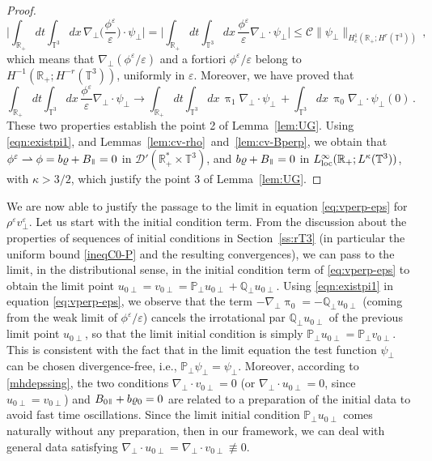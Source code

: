\documentclass[11pt,reqno]{amsart}
\def \R{{\mathbb{R}}}
\def \Q{{\mathbb{Q}}}
\def \T{{\mathbb{T}}}
\def \P{{\mathbb{P}}}
\newcommand{\myparallel}{{\mkern3mu\vphantom{\perp}\vrule depth 0pt\mkern2mu\vrule depth 0pt\mkern3mu}}
\begin{document}
\begin{proof}
\[
\bigg|\int_{\R_+}  dt \int_{\T^3}dx \, \nabla_\perp \Big(\frac{\phi^\varepsilon}{\varepsilon}\Big) \cdot \psi_\perp \bigg|
=\bigg|\int_{\R_+}  dt \int_{\T^3}dx \, \frac{\phi^\varepsilon}{\varepsilon} \nabla_\perp \cdot \psi_\perp \bigg|
\leq  \mathcal C \|\psi_\perp\|_{H_c^1(\R_+; H^r(\T^3))} \,,
\]
which means that $\nabla_\perp (\phi^\varepsilon/\varepsilon)$ and a fortiori $\phi^\varepsilon/\varepsilon$ belong to $H^{-1}(\R_+; H^{-r}(\T^3))$, uniformly in $\varepsilon$. Moreover, we have proved that
\[
\int_{\R_+}  dt \int_{\T^3}dx \, \frac{\phi^\varepsilon}{\varepsilon} \nabla_\perp \cdot \psi_\perp
\xrightarrow{\quad}  \int_{\R_+}  dt \int_{\T^3}dx \,  \uppi_1\nabla_\perp \cdot \psi_\perp\, +
\int_{\T^3}dx \,  \uppi_0\nabla_\perp \cdot \psi_\perp(0)\,.
\]
These two properties establish the point 2 of Lemma~\ref{lem:UG}. Using \eqref{eqn:existpi1}, and Lemmas~\ref{lem:cv-rho}~and~\ref{lem:cv-Bperp},  we obtain that $\phi^\varepsilon \rightharpoonup \phi=b \varrho + B_\myparallel =0$ in  $\mathcal D'(\R_+^* \times \T^3)$, and $b \varrho + B_\myparallel =0$ in $L_{\rm loc}^\infty(\R_+;L^\kappa(\T^3))$, with $\kappa >3/2$, which justify the point 3 of Lemma~\ref{lem:UG}.
\end{proof}  

We are now able to justify the passage to the limit in equation \eqref{eq:vperp-eps} for $\rho^\varepsilon v_\perp^\varepsilon$. Let us start with the initial condition term. From the discussion about the properties of sequences of initial conditions in Section~\ref{ss:rT3} (in particular the uniform bound \eqref{ineqC0-P} and the resulting convergences), we can pass to the limit, in the distributional sense, in the initial condition term of \eqref{eq:vperp-eps} to obtain the limit point  $u_{0 \perp } =v_{0 \perp }=\P_\perp u_{0 \perp } + \Q_\perp u_{0 \perp }$. Using \eqref{eqn:existpi1} in equation \eqref{eq:vperp-eps}, we observe that the term $-\nabla_\perp \uppi_0 = - \Q_\perp u_{0 \perp }$ (coming from the weak limit of $\phi^\varepsilon/\varepsilon$) cancels the irrotational par $\Q_\perp u_{0 \perp }$ of the previous limit point  $u_{0 \perp }$, so that the limit initial condition is simply $\P_\perp u_{0 \perp }=\P_\perp v_{0 \perp }$. This is consistent with the fact that in the limit equation the test function $\psi_\perp$ can be chosen divergence-free, i.e., $\P_\perp \psi_\perp =\psi_\perp$. Moreover, according to \eqref{mhdepssing}, the two conditions $ \nabla_\perp \cdot v_{0\perp} = 0 $ (or  $\nabla_\perp \cdot u_{0\perp} = 0 $, since $u_{0\perp} = v_{0\perp} $) and $ B_{0\myparallel} + b \varrho_0 = 0 $ are related to a preparation of the initial data to avoid fast time oscillations. Since the limit initial condition  $\P_\perp u_{0 \perp }$ comes naturally without any preparation, then in our framework, we can deal with general data satisfying $ \nabla_\perp \cdot u_{0 \perp} =\nabla_\perp \cdot v_{0 \perp} \not \equiv  0$.
\end{document}
